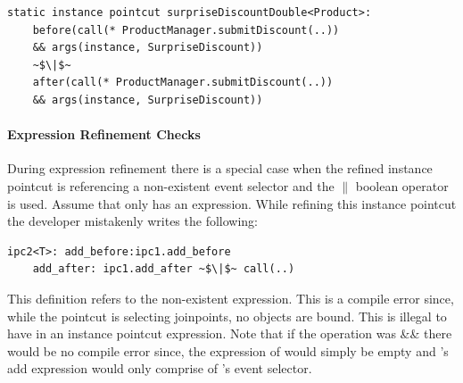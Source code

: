 \begin{lstlisting}[float=h!, moreemph=instance, caption={Adding the same object before and after the same join-point}, label={lst:objversion}]
static instance pointcut surpriseDiscountDouble<Product>: 
	before(call(* ProductManager.submitDiscount(..)) 
	&& args(instance, SurpriseDiscount)) 
	~$\|$~
	after(call(* ProductManager.submitDiscount(..)) 
	&& args(instance, SurpriseDiscount)) 
\end{lstlisting}

\paragraph*{Expression Refinement Checks}During expression refinement there is a special case when the refined instance pointcut is referencing a non-existent event selector and the $\|$ boolean operator is used.  Assume that  only has an  expression. While refining this instance pointcut the developer mistakenly writes the following: 

\begin{lstlisting}
ipc2<T>: add_before:ipc1.add_before 
	add_after: ipc1.add_after ~$\|$~ call(..)
\end{lstlisting}

This definition refers to the non-existent  expression. This is a compile error since, while the  pointcut is selecting joinpoints, no objects are bound.  This is illegal to have in an instance pointcut expression. Note that if the operation was \&\& there would be no compile error since, the  expression of  would simply be empty and 's add expression would only comprise of 's  event selector. 



